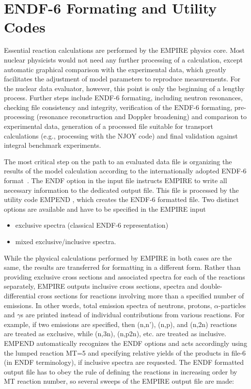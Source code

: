 \section{ENDF-6 Formating and Utility Codes\label{Sec:utility-codes}}

Essential reaction calculations are performed by the EMPIRE physics core.
Most nuclear physicists would not need any further processing of a
calculation, except
automatic graphical comparison with the experimental data, which greatly
facilitates the adjustment of model parameters to reproduce measurements. For
the nuclear data evaluator, however, this point is only the
beginning of a lengthy
process. Further steps include ENDF-6 formating, including neutron
resonances, checking file consistency and integrity, verification of the
ENDF-6 formating, pre-processing (resonance reconstruction and Doppler
broadening) and comparison to experimental data, generation of a
processed file suitable for transport calculations (e.g., processing with
the NJOY code) and final validation against integral benchmark experiments.

The most critical step on the path to an evaluated data file is organizing
the results of the model calculation according to the internationally
adopted ENDF-6 format~\cite{Herman:05a}. The ENDF option in the input file
instructs EMPIRE to write all necessary information to the dedicated output
file. This file is processed by the utility code EMPEND%
, which creates the ENDF-6 formatted file. Two distinct
options are available and have to be specified in the EMPIRE input

\begin{itemize}
\item exclusive spectra (classical ENDF-6 representation)

\item mixed exclusive/inclusive spectra.
\end{itemize}

While the physical calculations performed by EMPIRE in both cases are the
same, the results are transferred for formatting in a different form. Rather
than providing exclusive cross sections and associated spectra for each of
the reactions separately, EMPIRE outputs inclusive cross sections, spectra
and double-differential cross sections for reactions involving more than a
specified number of emissions. In other words, total emission spectra of
neutrons, protons, $\alpha$-particles and $\gamma$s are printed instead of
individual contributions from various reactions. For example, if two
emissions are specified, then (n,n'), (n,p), and (n,2n)
reactions are treated as exclusive, while (n,3n), (n,p2n), etc.
are treated as inclusive. EMPEND automatically
recognizes the ENDF options and acts accordingly using the lumped reaction MT=5
and specifying relative yields of the products in file-6 (in ENDF
terminology), if inclusive spectra are requested. The ENDF formatted output
file has to obey the rule of defining the reactions in increasing order by
MT reaction number, so several sweeps of the EMPIRE output file are made:

